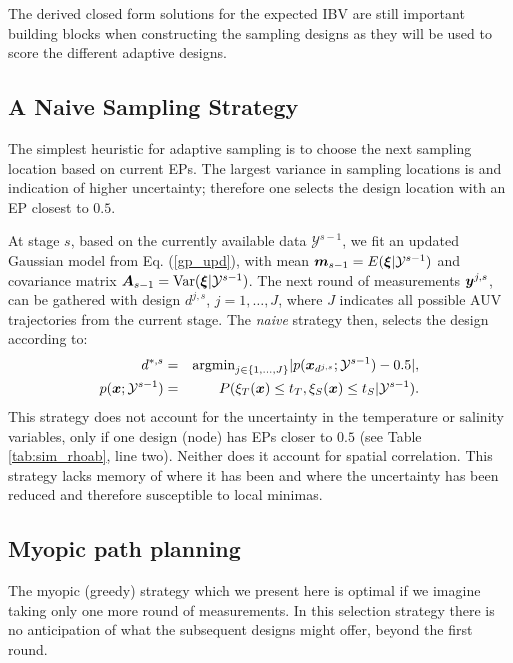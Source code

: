 \documentclass[aoas]{imsart}
\begin{document}
The derived closed form solutions for the expected IBV are still
important building blocks when constructing the sampling designs as
they will be used to score the different adaptive designs. %
 
\subsection{A Naive Sampling Strategy}
\label{naive}

The simplest heuristic for adaptive sampling is to choose the next
sampling location based on current EPs. The largest variance in
sampling locations is and indication of higher uncertainty; therefore
one selects the design location with an EP closest to $0.5$.

At stage $s$, based on the currently available data
$\mathcal{Y}^{s-1}$, we fit an updated Gaussian model from
Eq. (\ref{gp_upd}), with mean ${\boldsymbol m}_{s-1}=E({\boldsymbol \xi}|\mathcal{Y}^{s-1})$
and covariance matrix ${\boldsymbol A}_{s-1}=\mbox{Var}({\boldsymbol \xi}|\mathcal{Y}^{s-1})$.
The next round of measurements ${\boldsymbol y}^{j,s}$, can be gathered with
design $d^{j,s}$, $j=1,\ldots,J$, where $J$ indicates all possible AUV
trajectories from the current stage. The {\it{naive}} strategy then,
selects the design according to:
\begin{eqnarray}\label{critNaive}
    d^{*,s} &=& \mbox{argmin}_{j \in \{1,\ldots,J\}} |p(\bx_{d^{j,s}};\mathcal{Y}^{s-1})-0.5|, \\
    p(\bx;\mathcal{Y}^{s-1}) &=& P(\xi_T(\bx) \leq t_T, \xi_S(\bx) \leq t_S | \mathcal{Y}^{s-1}). \nonumber
\end{eqnarray}
This strategy does not account for the uncertainty in the temperature
or salinity variables, only if one design (node) has EPs closer to
$0.5$ (see Table \ref{tab:sim_rhoab}, line two). Neither does it
account for spatial correlation. This strategy lacks memory of where
it has been and where the uncertainty has been reduced and therefore
susceptible to local minimas.

\subsection{Myopic path planning}
\label{myopic}

The myopic (greedy) strategy which we present here is optimal if we
imagine taking only one more round of measurements. In this selection
strategy there is no anticipation of what the subsequent designs might
offer, beyond the first round.
\end{document}
